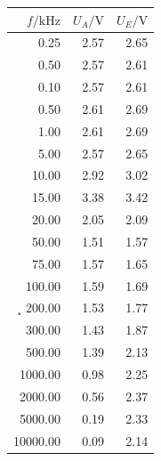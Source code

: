 \documentclass[]{scrartcl}
\begin{document}
\begin{table}[H]
	\centering
	\label{tab:ggverst_a}
	\hskip-1.50cm
	\begin{tabular}{r r r}
		\toprule
		$f / \si{\kilo\hertz}$ & $U_A/\si{\volt}$ & $U_E/\si{\volt}$ \\
		\midrule
		0.25	&	2.57	&	2.65 \\
		0.50	&	2.57	&	2.61 \\
		0.10	&	2.57	&	2.61 \\
		0.50	&	2.61	&	2.69 \\
		1.00	&	2.61	&	2.69 \\
		5.00	&	2.57	&	2.65 \\
		10.00	&	2.92	&	3.02 \\
		15.00	&	3.38	&	3.42 \\
		20.00	&	2.05	&	2.09 \\
		50.00	&	1.51	&	1.57 \\
		75.00	&	1.57	&	1.65 \\
		100.00	&	1.59	&	1.69 \\¸
		200.00	&	1.53	&	1.77 \\
		300.00	&	1.43	&	1.87 \\
		500.00	&	1.39	&	2.13 \\
		1000.00	&	0.98	&	2.25 \\
		2000.00	&	0.56	&	2.37 \\
		5000.00	&	0.19	&	2.33 \\
		10000.00	&	0.09	&	2.14 \\
		\bottomrule
	\end{tabular}
\end{table}
\end{document}
